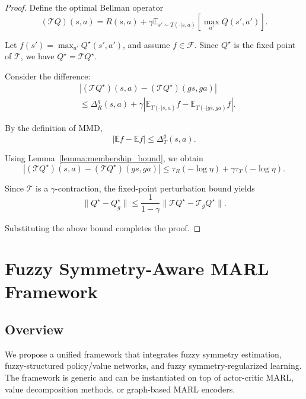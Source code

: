 \documentclass[lettersize,journal]{IEEEtran}
\begin{document}
\begin{proof}
Define the optimal Bellman operator
\[
(\mathcal T Q)(s,a)
=
R(s,a)
+
\gamma \mathbb E_{s'\sim T(\cdot|s,a)}
\left[\max_{a'} Q(s',a')\right].
\]

Let $f(s') = \max_{a'} Q^\star(s',a')$, and assume $f \in \mathcal F$. Since $Q^\star$ is the fixed point of $\mathcal T$, we have $Q^\star = \mathcal T Q^\star$.

Consider the difference:
\[
\begin{aligned}
&|(\mathcal T Q^\star)(s,a) - (\mathcal T Q^\star)(gs,ga)| \\
&\le \Delta_R^g(s,a)
+
\gamma \left|
\mathbb E_{T(\cdot|s,a)} f
-
\mathbb E_{T(\cdot|gs,ga)} f
\right|.
\end{aligned}
\]

By the definition of MMD,
\[
\left|
\mathbb E f - \mathbb E f
\right|
\le \Delta_T^g(s,a).
\]

Using Lemma~\ref{lemma:membership_bound}, we obtain
\begin{equation}
    |(\mathcal T Q^\star)(s,a) - (\mathcal T Q^\star)(gs,ga)|
    \le
    \tau_R(-\log\eta)
    +
    \gamma \tau_T(-\log\eta).
\end{equation}

Since $\mathcal T$ is a $\gamma$-contraction, the fixed-point perturbation bound yields
\[
\|Q^\star - Q^\star_g\|
\le
\frac{1}{1-\gamma}
\|\mathcal T Q^\star - \mathcal T_g Q^\star\|.
\]

Substituting the above bound completes the proof.
\end{proof}











\section{Fuzzy Symmetry-Aware MARL Framework}
\subsection{Overview}
We propose a unified framework that integrates fuzzy symmetry estimation, fuzzy-structured policy/value networks, and fuzzy symmetry-regularized learning. The framework is generic and can be instantiated on top of actor-critic MARL, value decomposition methods, or graph-based MARL encoders.
\end{document}
